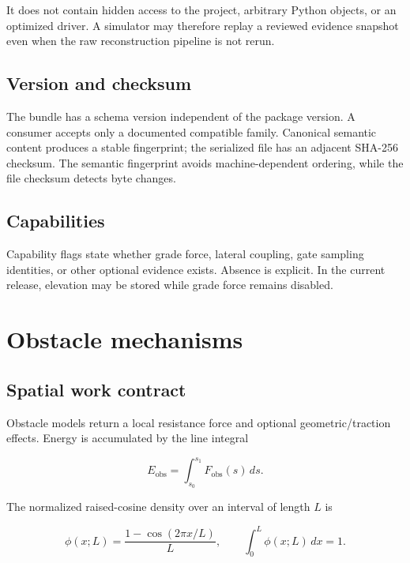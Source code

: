\documentclass[11pt,oneside]{report}
\begin{document}
It does not contain hidden access to the project, arbitrary Python objects, or an
optimized driver.  A simulator may therefore replay a reviewed evidence snapshot even
when the raw reconstruction pipeline is not rerun.

\section{Version and checksum}

The bundle has a schema version independent of the package version.  A consumer accepts
only a documented compatible family.  Canonical semantic content produces a stable
fingerprint; the serialized file has an adjacent SHA-256 checksum.  The semantic
fingerprint avoids machine-dependent ordering, while the file checksum detects byte
changes.

\section{Capabilities}

Capability flags state whether grade force, lateral coupling, gate sampling identities,
or other optional evidence exists.  Absence is explicit.  In the current release,
elevation may be stored while grade force remains disabled.

\chapter{Obstacle mechanisms}\label{ch:obstacles}

\section{Spatial work contract}

Obstacle models return a local resistance force and optional geometric/traction effects.
Energy is accumulated by the line integral

\begin{equation}
E_{\mathrm{obs}}=\int_{s_0}^{s_1}F_{\mathrm{obs}}(s)\,ds.
\end{equation}

The normalized raised-cosine density over an interval of length $L$ is

\begin{equation}
\phi(x;L)=\frac{1-\cos(2\pi x/L)}{L},\qquad
\int_0^L\phi(x;L)\,dx=1.
\label{eq:raised-cosine}
\end{equation}
\end{document}
